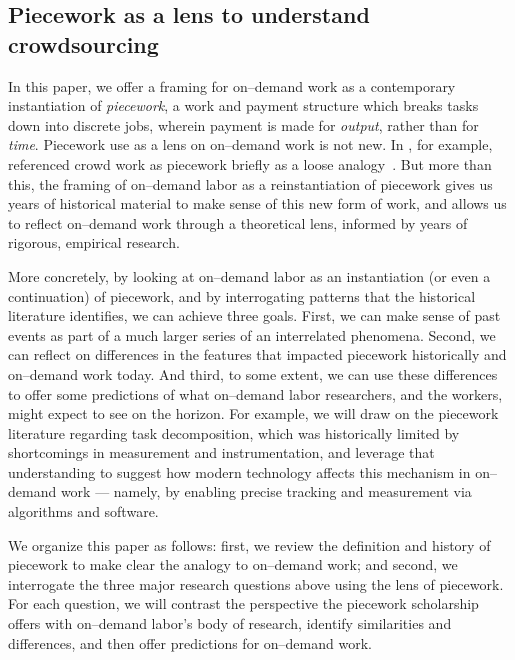 \documentclass[trackingWork]{subfiles}
\begin{document}
\subsection{Piecework as a lens to understand crowdsourcing}
In this paper, we offer a framing for on--demand work as a contemporary instantiation of \textit{piecework},
a work and payment structure which breaks tasks down into discrete jobs,
wherein payment is made for \textit{output}, rather than for \textit{time}.
Piecework use as a lens on on--demand work is not new.
In \citeyear{crowdworkFuture}, for example,
\citeauthor{crowdworkFuture} referenced crowd work as piecework briefly
as a loose analogy~\cite{crowdworkFuture}.
But more than this,
the framing of on--demand labor as a reinstantiation of piecework %
gives us years of historical material to make sense of this new form of work, and
allows us to reflect on--demand work through a theoretical lens, informed by years of rigorous, empirical research.

More concretely, by looking at on--demand labor as
an instantiation (or even a continuation) of piecework,
and by interrogating patterns that the historical literature identifies, we can achieve three goals.
First, we can make sense of past events as part of a much larger series of an interrelated phenomena.
Second, we can reflect on differences in the features that impacted piecework historically and on--demand work today.
And third, to some extent, we can use these differences to offer some predictions of what on--demand labor researchers,
and the workers,
might expect to see on the horizon.
For example, we will draw on the piecework literature regarding task decomposition,
which was historically limited by shortcomings in measurement and instrumentation, and
leverage that understanding to suggest how modern technology affects this mechanism in on--demand work
--- namely, by enabling precise tracking and measurement via algorithms and software.

We organize this paper as follows:
first, we review the definition and history of piecework
to make clear the analogy to on--demand work;
and second, we interrogate the three major research questions above using the lens of piecework. 
For each question, we will
contrast the perspective the piecework scholarship offers with on--demand labor's body of research,
identify similarities and differences, and then
offer predictions for on--demand work.

\onlyinsubfile{
  \printbibliography
}
\end{document}

